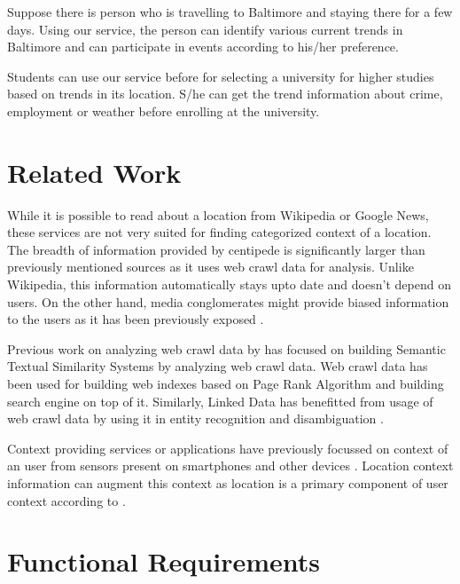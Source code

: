 \documentclass[conference]{IEEEtran}
\begin{document}
Suppose there is person who is travelling to Baltimore and staying there for a few days. Using our service, the person can identify various current trends in Baltimore and can participate in events according to his/her preference. 

Students can use our service before for selecting a university for higher studies based on trends in its location. S/he can get the trend information about crime, employment or weather before enrolling at the university. 

\section{Related Work}

While it is possible to read about a location from Wikipedia or Google News, these services are not very suited for finding categorized context of a location. The breadth of information provided by centipede is significantly larger than previously mentioned sources as it uses web crawl data for analysis. Unlike Wikipedia, this information automatically stays upto date and doesn't depend on users. On the other hand, media conglomerates might provide biased information to the users as it has been previously exposed \cite{med:one} \cite{med:two}.   

Previous work on analyzing web crawl data by \cite{semsim:lushan} has focused on building Semantic Textual Similarity Systems by analyzing web crawl data. Web crawl data has been used for building web indexes based on Page Rank Algorithm\cite{pr:page} and building search engine on top of it. Similarly, Linked Data has benefitted from usage of web crawl data by using it in entity recognition and disambiguation \cite{db:klu}.

Context providing services or applications have previously focussed on context of an user from sensors present on smartphones and other devices \cite{mo:sens}. Location context information can augment this context as location is a primary component of user context according to \cite{abo:wd}.  

\section{Functional Requirements}

\end{document}
